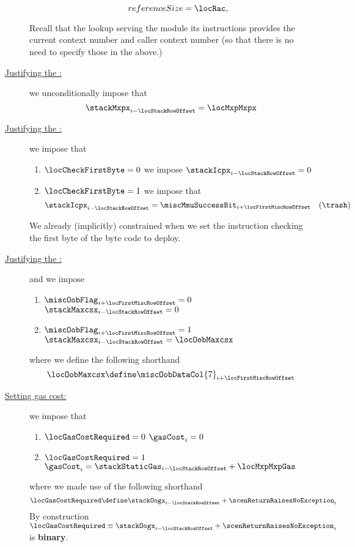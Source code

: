 \begin{description}
\begin{enumerate}
\[{						referenceSize   = \locRac                ,
					}
				\]
		\end{enumerate}
		\saNote{} Recall that the lookup serving the \mmuMod{} module its instructions provides the current context number \cn{} and caller context number \caller{} (so that there is no need to specify those in the above.)
	\item[\underline{Justifying the \stackMxpx{}:}]
		we unconditionally impose that
		\[
			\stackMxpx _{i - \locStackRowOffset} = \locMxpMxpx
		\]
	\item[\underline{Justifying the \stackIcpx{}:}]
		we impose that
		\begin{enumerate}
			\item \If $\locCheckFirstByte = 0$ \Then we impose $\stackIcpx _{i - \locStackRowOffset} = 0$
			\item \If $\locCheckFirstByte = 1$ \Then we impose that
				\[
					\stackIcpx _{i - \locStackRowOffset} = \miscMmuSuccessBit _{i + \locFirstMiscRowOffset} \quad (\trash)
				\]
		\end{enumerate}
		\saNote{} We already (implicitly) constrained \stackIcpx{} when we set the \mmuMod{} instruction checking the first byte of the byte code to deploy.
	\item[\underline{Justifying the \stackMaxcsx{}:}]
		and we impose
		\begin{enumerate}
			\item \If $\miscOobFlag _{i + \locFirstMiscRowOffset} = 0$ \Then $\stackMaxcsx _{i - \locStackRowOffset} = 0$
			\item \If $\miscOobFlag _{i + \locFirstMiscRowOffset} = 1$ \Then $\stackMaxcsx _{i - \locStackRowOffset} = \locOobMaxcsx$
		\end{enumerate}
		where we define the following shorthand
		\[
			\locOobMaxcsx
			\define
			\miscOobDataCol{7} _{i + \locFirstMiscRowOffset}
		\]
	\item[\underline{Setting gas cost:}]
		we impose that
		\begin{enumerate}
			\item \If $\locGasCostRequired = 0$ \Then $\gasCost_{i} = 0$
			\item \If $\locGasCostRequired = 1$ \Then $\gasCost_{i} = \stackStaticGas _{i - \locStackRowOffset} + \locMxpMxpGas$
		\end{enumerate}
		where we made use of the following shorthand
		\[
			\locGasCostRequired \define \stackOogx _{i - \locStackRowOffset} + \scenReturnRaisesNoException _{i}
		\]
		\saNote{} By construction $\locGasCostRequired \equiv \stackOogx _{i - \locStackRowOffset} + \scenReturnRaisesNoException _{i}$ is \textbf{binary}.
\end{description}
